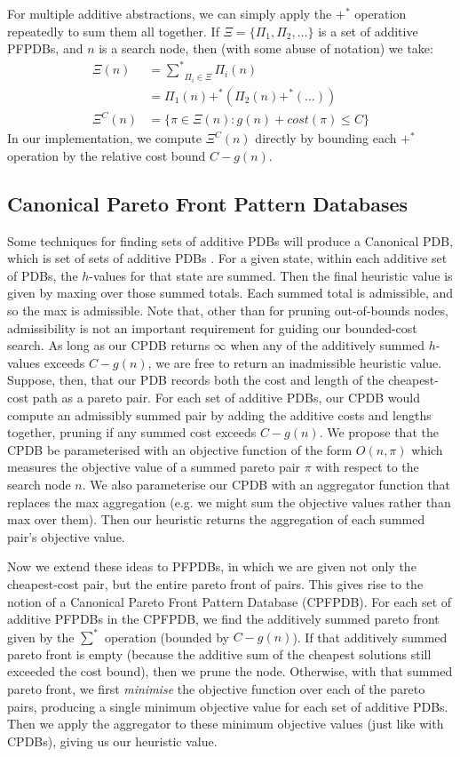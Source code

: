 \documentclass[letterpaper]{article} %
\begin{document}
For multiple additive abstractions,
we can simply apply the \(+^*\)
operation repeatedly to sum them all together.
If \(\Xi = \{\Pi_{1}, \Pi_{2}, \ldots\}\) is a set of additive PFPDBs,
and \(n\) is a search node, then (with some abuse of notation)
we take:
\begin{align*}
\Xi(n) &= \underset{\Pi_{i} \in \Xi}{{\sum}^*} \Pi_{i}(n) \\
&= \Pi_{1}(n) +^* (\Pi_{2}(n) +^* (\ldots)) \\
\Xi^C(n) &= \{\pi \in \Xi(n) : g(n) + cost(\pi) \leq C\}
\end{align*}
In our implementation, we compute \(\Xi^C(n)\) directly
by bounding each \(+^*\) operation by the relative cost bound \(C - g(n)\).

\subsection{Canonical Pareto Front Pattern Databases}

Some techniques for finding sets of additive PDBs will
produce a Canonical PDB, which is set of sets of additive PDBs \cite{haslum2007domain}.
For a given state, within each additive set of PDBs, the \(h\)-values for that state are summed.
Then the final heuristic value is given by maxing over those summed totals.
Each summed total is admissible, and so the max is admissible.
Note that, other than for pruning out-of-bounds nodes, admissibility is not an important requirement for guiding our bounded-cost search.
As long as our CPDB returns \(\infty\) when any of
the additively summed \(h\)-values exceeds \(C - g(n)\),
we are free to return an inadmissible heuristic value.
Suppose, then, that our PDB records both the cost and length of the cheapest-cost path as a pareto pair.
For each set of additive PDBs, our CPDB would compute an admissibly summed pair
by adding the additive costs and lengths together, pruning if any summed cost exceeds \(C - g(n)\).
We propose that the CPDB be parameterised with an objective function of the form \(O(n, \pi)\) which
measures the objective value of a summed pareto pair \(\pi\) with respect to the search node \(n\).
We also parameterise our CPDB with an aggregator function
that replaces the max aggregation (e.g. we might sum the objective values rather than max over them).
Then our heuristic returns the aggregation of each summed pair's objective value.

Now we extend these ideas to PFPDBs, in which we are given not only the cheapest-cost pair, but the entire pareto front of pairs.
This gives rise to the notion of a Canonical Pareto Front Pattern Database (CPFPDB).
For each set of additive PFPDBs in the CPFPDB, we find the additively summed pareto front given by the \(\sum^*\) operation (bounded by \(C - g(n)\)).
If that additively summed pareto front is empty (because the additive sum of the cheapest solutions still exceeded the cost bound), then we prune the node.
Otherwise, with that summed pareto front,
we first \textit{minimise} the objective function over each of the pareto pairs,
producing a single minimum objective value for each set of additive PDBs.
Then we apply the aggregator to these minimum objective values (just like with CPDBs), giving us our heuristic value.
\end{document}
